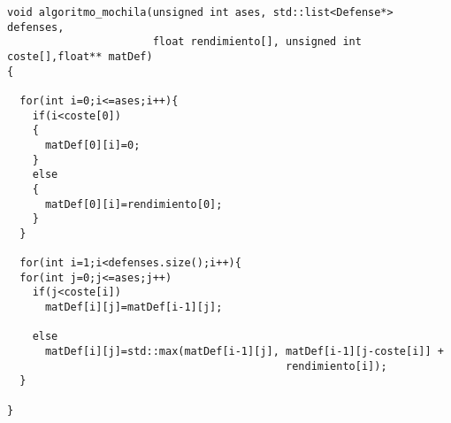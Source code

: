 \begin{lstlisting}
void algoritmo_mochila(unsigned int ases, std::list<Defense*> defenses,
                       float rendimiento[], unsigned int coste[],float** matDef)
{

  for(int i=0;i<=ases;i++){
    if(i<coste[0])
    {
      matDef[0][i]=0;
    }
    else
    {
      matDef[0][i]=rendimiento[0];
    }
  }

  for(int i=1;i<defenses.size();i++){
  for(int j=0;j<=ases;j++)
    if(j<coste[i])
      matDef[i][j]=matDef[i-1][j];

    else
      matDef[i][j]=std::max(matDef[i-1][j], matDef[i-1][j-coste[i]] +
                                            rendimiento[i]);
  }

}
\end{lstlisting}
